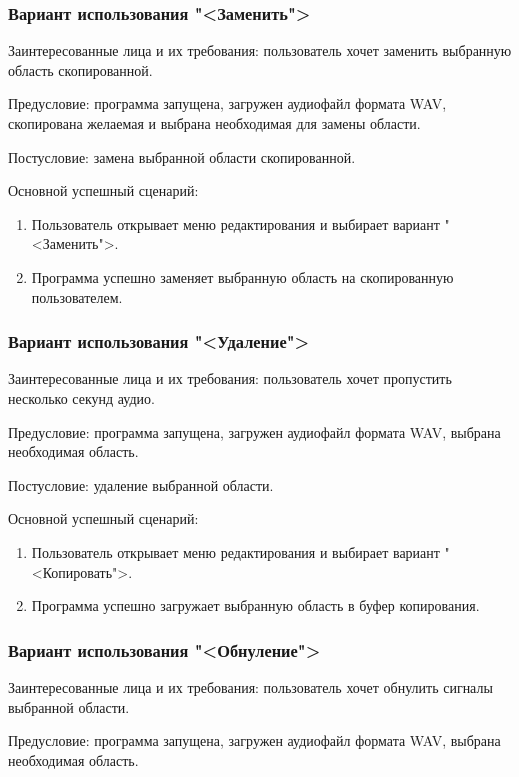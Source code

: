 \subsubsection{Вариант использования "<Заменить">}

Заинтересованные лица и их требования: пользователь хочет заменить выбранную область скопированной.

Предусловие: программа запущена, загружен аудиофайл формата WAV, скопирована желаемая и выбрана необходимая для замены области.

Постусловие: замена выбранной области скопированной.

Основной успешный сценарий:
\begin{enumerate}
	\item Пользователь открывает меню редактирования и выбирает вариант "<Заменить">.
	\item Программа успешно заменяет выбранную область на скопированную пользователем.
\end{enumerate} 

\subsubsection{Вариант использования "<Удаление">}

Заинтересованные лица и их требования: пользователь хочет пропустить несколько секунд аудио.

Предусловие: программа запущена, загружен аудиофайл формата WAV, выбрана необходимая область.

Постусловие: удаление выбранной области.

Основной успешный сценарий:
\begin{enumerate}
	\item Пользователь открывает меню редактирования и выбирает вариант "<Копировать">.
	\item Программа успешно загружает выбранную область в буфер копирования.
\end{enumerate} 

\subsubsection{Вариант использования "<Обнуление">}

Заинтересованные лица и их требования: пользователь хочет обнулить сигналы выбранной области.

Предусловие: программа запущена, загружен аудиофайл формата WAV, выбрана необходимая область.

